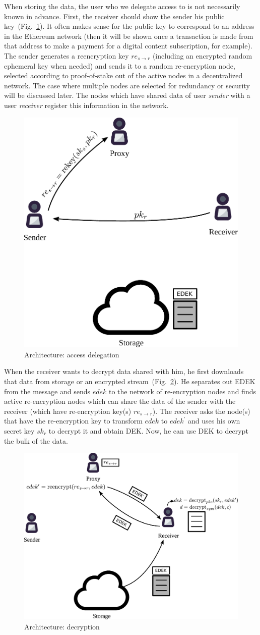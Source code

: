 \documentclass[notitlepage,longbibliography]{revtex4-1}
\begin{document}
When storing the data, the user who we delegate access to is not necessarily known in advance.
First, the receiver should show the sender his public key~(Fig.~\ref{fig:arch-delegate}).
It often makes sense for the public key to correspond to an address in the Ethereum network (then it will be shown once a transaction is made from that
address to make a payment for a digital content subscription, for example).
The sender generates a reencryption key $re_{s\rightarrow r}$ (including an encrypted random ephemeral key when needed) and sends it to a random re-encryption
node, selected according to proof-of-stake out of the active nodes in a decentralized network.
The case where multiple nodes are selected for redundancy or security will be discussed later.
The nodes which have shared data of user \emph{sender} with a user \emph{receiver} register this information in the network.
\begin{figure}
\centering
    \includegraphics[width=0.4\columnwidth]{pdf/delegate.pdf}
    \caption{Architecture: access delegation}
    \label{fig:arch-delegate}
\end{figure}

When the receiver wants to decrypt data shared with him, he first downloads that data from storage or an encrypted stream~(Fig.~\ref{fig:arch-decrypt}).
He separates out EDEK from the message and sends $edek$ to the network of re-encryption nodes and finds active re-encryption nodes which can share the data
of the sender with the receiver (which have re-encryption key(s) $re_{s\rightarrow r}$).
The receiver asks the node(s) that have the re-encryption key to transform $edek$ to $edek^{\prime}$ and uses his own secret key $sk_r$ to decrypt it and
obtain DEK.
Now, he can use DEK to decrypt the bulk of the data.
\begin{figure}
\centering
    \includegraphics[width=0.6\columnwidth]{pdf/decrypt.pdf}
    \caption{Architecture: decryption}
    \label{fig:arch-decrypt}
\end{figure}
\end{document}
